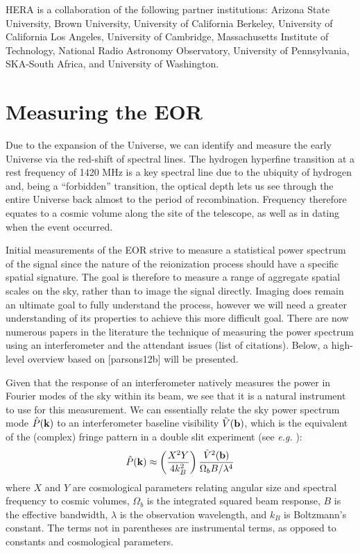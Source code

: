 \documentclass{article}
\newcommand{\kvec}{{\bf k}}
\newcommand{\bvec}{{\bf b}}
\begin{document}
HERA is a collaboration of the following partner institutions:  Arizona State University, Brown University, University of California Berkeley, University of California Los Angeles, University of Cambridge, Massachusetts Institute of Technology, National Radio Astronomy Observatory, University of Pennsylvania, SKA-South Africa, and
University of Washington.

\section{Measuring the EOR}
\label{sec:eormeas}
Due to the expansion of the Universe, we can identify and measure the early Universe via the red-shift of spectral lines.  The hydrogen hyperfine transition at a rest frequency of 1420 MHz is a key spectral line due to the ubiquity of hydrogen and, being a ``forbidden'' transition, the optical depth lets us see through the entire Universe back almost to the period of recombination.  Frequency therefore equates to a cosmic volume along the site of the telescope, as well as in dating when the event occurred. 

Initial measurements of the EOR strive to measure a statistical power spectrum of the signal since the nature of the reionization process should have a specific spatial signature.  The goal is therefore to measure a range of aggregate spatial scales on the sky, rather than to image the signal directly.  Imaging does remain an ultimate goal to fully understand the process, however we will need a greater understanding of its properties to achieve this more difficult goal.  There are now numerous papers in the literature the technique of measuring the power spectrum using an interferometer and the attendant issues (list of citations).  Below, a high-level overview based on [parsons12b] will be presented.

Given that the response of an interferometer natively measures the power in Fourier modes of the sky within its beam, we see that it is a natural instrument to use for this measurement.  We can essentially relate the sky power spectrum mode ${\hat P}(\kvec)$ to an interferometer baseline visibility ${\tilde V}(\bvec)$, which is the equivalent of the (complex) fringe pattern in a double slit experiment (see {\em e.g.} \cite{2012ApJ...756..165P}):
\begin{equation}
{\hat P}(\kvec) \approx \left(\frac{X^2Y}{4k_B^2}\right) \frac{{\tilde V}^2(\bvec)}{\Omega_b B/ \lambda^4} 
\end{equation}
where $X$ and $Y$ are cosmological parameters relating angular size and spectral frequency to cosmic volumes, $\Omega_b$ is the integrated squared beam response, $B$ is the effective bandwidth, $\lambda$ is the observation wavelength, and $k_B$ is Boltzmann's constant.  The terms not in parentheses are instrumental terms, as opposed to constants and cosmological parameters.
\end{document}
